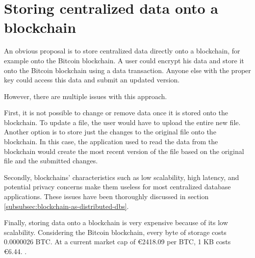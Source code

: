 \section{Storing centralized data onto a blockchain}
\label{store-on-Bitcoin}

\iffalse
- very obvious solution would be to store data directly onto a blockchain, eg. the Bitcoin blockchain. you would just put all the data, properly encrypted, directly onto the blockchain and it is stored

\fi

An obvious proposal is to store centralized data directly onto a blockchain, for example onto the Bitcoin blockchain. A user could encrypt his data and store it onto the Bitcoin blockchain using a data transaction. Anyone else with the proper key could access this data and submit an updated version.

\iffalse
- various issues arise: 
  - basic functionality is missing that several applications need: you are not able to change or remove data once stored data, to update a file you would have to store the entire file again or store just the change and have your application reading the blockchain create the most recent file.
  - as mentioned in section \ref{subsubsec:blockchain-as-distributed-dbs}, blockchains deal with low scalability, high latency and potential privacy concerns.
  - insanely expensive: 0.0000026 BTC per byte \cite{Bitcoin-transaction-fee}. At a current market cap of €2418.09 per BTC, the cost of storage is €6.44 per KB. \cite{Bitcoin-market-cap}
\fi

However, there are multiple issues with this approach. 

First, it is not possible to change or remove data once it is stored onto the blockchain. To update a file, the user would have to upload the entire new file. Another option is to store just the changes to the original file onto the blockchain. In this case, the application used to read the data from the blockchain would create the most recent version of the file based on the original file and the submitted changes. 

Secondly, blockchains' characteristics such as low scalability, high latency, and potential privacy concerns make them useless for most centralized database applications. These issues have been thoroughly discussed in section \ref{subsubsec:blockchain-as-distributed-dbs}.

Finally, storing data onto a blockchain is very expensive because of its low scalability. Considering the Bitcoin blockchain, every byte of storage costs 0.0000026 BTC\cite{Bitcoin-transaction-fee}. At a current market cap of \euro 2418.09 per BTC, 1 KB costs \euro 6.44. \cite{Bitcoin-market-cap}.

